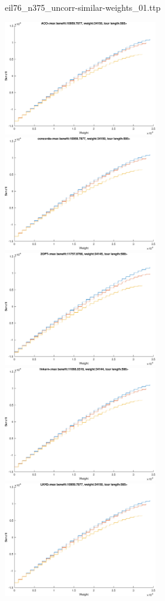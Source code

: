 \documentclass{article}
\begin{document}
\newpage
eil76\_n375\_uncorr-similar-weights\_01.ttp

\noindent
\includegraphics[width=0.5\textwidth]{eil76figs/eil76_n375_uncorr-similar-weights_01.ttp.aco.txt.atsf.eps}
\includegraphics[width=0.5\textwidth]{eil76figs/eil76_n375_uncorr-similar-weights_01.ttp.con.txt.atsf.eps}
\includegraphics[width=0.5\textwidth]{eil76figs/eil76_n375_uncorr-similar-weights_01.ttp.inv.txt.atsf.eps}
\includegraphics[width=0.5\textwidth]{eil76figs/eil76_n375_uncorr-similar-weights_01.ttp.lkh.txt.atsf.eps}
\includegraphics[width=0.5\textwidth]{eil76figs/eil76_n375_uncorr-similar-weights_01.ttp.lkh2.txt.atsf.eps}
\end{document}
